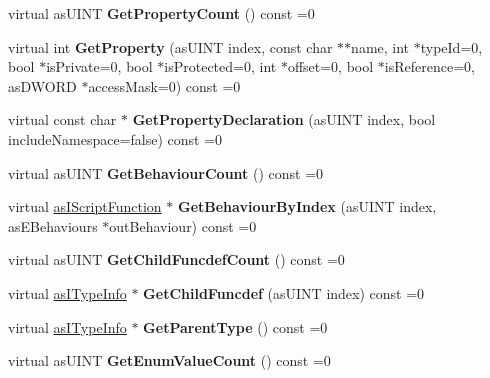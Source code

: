 \begin{DoxyCompactItemize}
virtual as\+U\+I\+NT {\bfseries Get\+Property\+Count} () const =0
\item 
\mbox{\label{classas_i_type_info_a99667684c3465389bc9ae08dfdcd8ab9}} 
virtual int {\bfseries Get\+Property} (as\+U\+I\+NT index, const char $\ast$$\ast$name, int $\ast$type\+Id=0, bool $\ast$is\+Private=0, bool $\ast$is\+Protected=0, int $\ast$offset=0, bool $\ast$is\+Reference=0, as\+D\+W\+O\+RD $\ast$access\+Mask=0) const =0
\item 
\mbox{\label{classas_i_type_info_a9e6916f51f09970d268378aef9601349}} 
virtual const char $\ast$ {\bfseries Get\+Property\+Declaration} (as\+U\+I\+NT index, bool include\+Namespace=false) const =0
\item 
\mbox{\label{classas_i_type_info_ad7c3c757cc99df4d40c6b3b44896cb96}} 
virtual as\+U\+I\+NT {\bfseries Get\+Behaviour\+Count} () const =0
\item 
\mbox{\label{classas_i_type_info_ae91a1b2080e76a0dcad8106436728314}} 
virtual \hyperlink{classas_i_script_function}{as\+I\+Script\+Function} $\ast$ {\bfseries Get\+Behaviour\+By\+Index} (as\+U\+I\+NT index, as\+E\+Behaviours $\ast$out\+Behaviour) const =0
\item 
\mbox{\label{classas_i_type_info_aa9b5a0281ff01d448e55cb10e42ba340}} 
virtual as\+U\+I\+NT {\bfseries Get\+Child\+Funcdef\+Count} () const =0
\item 
\mbox{\label{classas_i_type_info_a01fe2f0b68614246a63e52cada374b69}} 
virtual \hyperlink{classas_i_type_info}{as\+I\+Type\+Info} $\ast$ {\bfseries Get\+Child\+Funcdef} (as\+U\+I\+NT index) const =0
\item 
\mbox{\label{classas_i_type_info_aa2836268d01f3a4424263190b57d9b04}} 
virtual \hyperlink{classas_i_type_info}{as\+I\+Type\+Info} $\ast$ {\bfseries Get\+Parent\+Type} () const =0
\item 
\mbox{\label{classas_i_type_info_abe22697bab6560c30c9b613187d6b4d7}} 
virtual as\+U\+I\+NT {\bfseries Get\+Enum\+Value\+Count} () const =0
\item 
$$
\end{DoxyCompactItemize}
